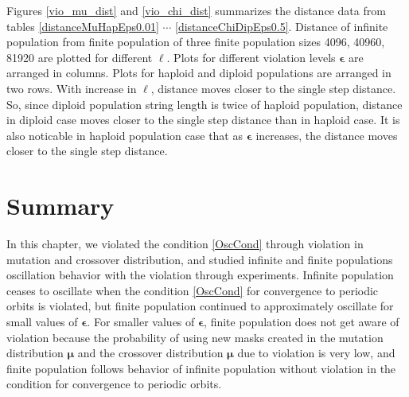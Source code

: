 Figures \ref{vio_mu_dist} and \ref{vio_chi_dist} summarizes the distance data from tables \ref{distanceMuHapEps0.01} $\cdots$ 
\ref{distanceChiDipEps0.5}. Distance of infinite population from finite population of 
three finite population sizes {4096, 40960, 81920} are plotted for different $\ell$. 
Plots for different violation levels $\bm{\epsilon}$ are arranged in columns. 
Plots for haploid and diploid populations are arranged in two rows. With increase in $\ell$, 
distance moves closer to the single step distance. So, since diploid population 
string length is twice of haploid population, 
distance in diploid case moves closer to the single step distance than in haploid case. 
It is also noticable in haploid population case that as $\bm{\epsilon}$ increases, 
the distance moves closer to the single step distance.

\clearpage
\section{Summary}
In this chapter, we violated the condition \ref{OscCond} through violation in mutation and crossover distribution, and 
studied infinite and finite populations oscillation behavior with the violation through experiments. 
Infinite population ceases to oscillate when the condition \ref{OscCond} for convergence to 
periodic orbits is violated, but finite population continued to approximately oscillate for small values of $\bm{\epsilon}$. 
For smaller values of $\bm{\epsilon}$, finite population does not get aware of violation because the probability of using 
new masks created in the mutation distribution $\bm{\mu}$ and the crossover distribution $\bm{\mu}$ due to violation is very low, and 
finite population follows behavior of infinite population without violation in the condition for convergence to 
periodic orbits.





 
